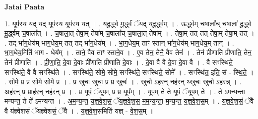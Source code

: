 \documentclass[17pt]{extarticle}
\begin{document}
\textbf{Jatai Paata} \newline

1. यूप॑स्य॒ यद् यद् यूप॑स्य॒ यूप॑स्य॒ यत् । . यदू॒र्द्ध्व मू॒र्द्ध्वं ॅयद् यदू॒र्द्ध्वम् । . ऊ॒र्द्ध्वम् च॒षाला᳚च् च॒षाला॑ दू॒र्द्ध्व मू॒र्द्ध्वम् च॒षाला᳚त् । . च॒षाला॒त् तेषा॒म् तेषा᳚म् च॒षाला᳚च् च॒षाला॒त् तेषा᳚म् । . तेषा॒म् तत् तत् तेषा॒म् तेषा॒म् तत् । . तद् भा॑ग॒धेय॑म् भाग॒धेय॒म् तत् तद् भा॑ग॒धेय᳚म् । . भा॒ग॒धेय॒म् ताꣳ स्तान् भा॑ग॒धेय॑म् भाग॒धेय॒म् तान् । . भा॒ग॒धेय॒मिति॑ भाग - धेय᳚म् । . ताने॒ वैव ताꣳ स्ताने॒व । . ए॒व तेन॒ तेनै॒ वैव तेन॑ । . तेन॑ प्रीणाति प्रीणाति॒ तेन॒ तेन॑ प्रीणाति । . प्री॒णा॒ति॒ दे॒वा दे॒वाः प्री॑णाति प्रीणाति दे॒वाः । . दे॒वा वै वै दे॒वा दे॒वा वै । . वै सꣳस्थि॑ते॒ सꣳस्थि॑ते॒ वै वै सꣳस्थि॑ते । . सꣳस्थि॑ते॒ सोमे॒ सोमे॒ सꣳस्थि॑ते॒ सꣳस्थि॑ते॒ सोमे᳚ । . सꣳस्थि॑त॒ इति॒ सं - स्थि॒ते॒ । . सोमे॒ प्र प्र सोमे॒ सोमे॒ प्र । . प्र स्रुचः॒ स्रुचः॒ प्र प्र स्रुचः॑ । . स्रुचो ऽह॑र॒न् नह॑र॒न् थ्स्रुचः॒ स्रुचो ऽह॑रन्न् । . अह॑र॒न् प्र प्राह॑र॒न् नह॑र॒न् प्र । . प्र यूपं॒ ॅयूप॒म् प्र प्र यूप᳚म् । . यूप॒म् ते ते यूपं॒ ॅयूप॒म् ते । . ते॑ ऽमन्यन्ता मन्यन्त॒ ते ते॑ ऽमन्यन्त । . अ॒म॒न्य॒न्त॒ य॒ज्ञ्॒वे॒श॒सं॒ ॅय॒ज्ञ्॒वे॒श॒स॒ म॒म॒न्य॒न्ता॒ म॒न्य॒न्त॒ य॒ज्ञ्॒वे॒श॒स॒म् । . य॒ज्ञ्॒वे॒श॒सं॒ ॅवै वै य॑ज्ञ्वेशसं ॅयज्ञ्वेशसं॒ ॅवै । . य॒ज्ञ्॒वे॒श॒समिति॑ यज्ञ् - वे॒श॒स॒म् । \newline
\end{document}
